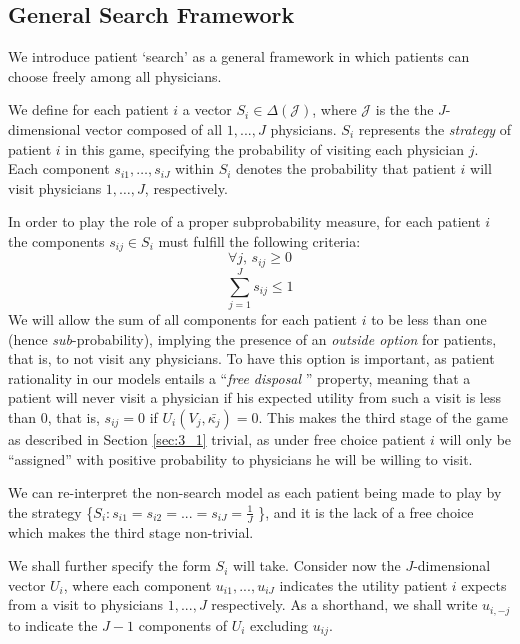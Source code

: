 \documentclass[../main.tex]{subfiles}
\begin{document}
\subsection{General Search Framework}

We introduce patient `search' as a general framework in which patients can choose freely among all physicians.

We define for each patient $i$ a vector $S_i \in \Delta(\mathcal{J})$, where $\mathcal{J}$ is the the $J$-dimensional vector composed of all $1, ..., J$ physicians. $S_i$ represents the \textit{strategy} of patient \( i \) in this game, specifying the probability of visiting each physician \( j \). Each component \( s_{i1}, \ldots, s_{iJ} \) within \( S_i \) denotes the probability that patient \( i \) will visit physicians \( 1, \ldots, J \), respectively.


In order to play the role of a proper subprobability measure, for each patient $i$ the components $s_{ij} \in S_i$ must fulfill the following criteria:
\begin{equation} \tag{i}
    \forall j, \, s_{ij} \geq 0
\end{equation}
\begin{equation} \tag{ii}
    \sum_{j = 1}^{J} s_{ij} \leq 1
\end{equation}
We will allow the sum of all components for each patient $i$ to be less than one (hence \textit{sub}-probability), implying the presence of an \textit{outside option} for patients, that is, to not visit any physicians. To have this option is important, as patient rationality in our models entails a  ``\textit{free disposal} \hspace{-0.1cm}'' property, meaning that a patient will never visit a physician if his expected utility from such a visit is less than $0$, that is, $s_{ij} = 0$ if $U_i(V_j,\bar{\kappa_j}) = 0$. This makes the third stage of the game as described in Section \ref{sec:3_1} trivial, as under free choice patient $i$ will only be ``assigned'' with positive probability to physicians he will be willing to visit.

We can re-interpret the non-search model as each patient being made to play by the strategy \{$S_i: s_{i1} = s_{i2} = ... = s_{iJ} = \frac{1}{J}$ \}, and it is the lack of a free choice which makes the third stage non-trivial.

We shall further specify the form $S_i$ will take. Consider now the $J$-dimensional vector $U_i$, where each component $u_{i1}, ... , u_{iJ}$ indicates the utility patient $i$ expects from a visit to physicians $1, ..., J$ respectively. As a shorthand, we shall write $u_{i,-j}$ to indicate the $J - 1$ components of $U_i$ excluding $u_{ij}$.
\end{document}
